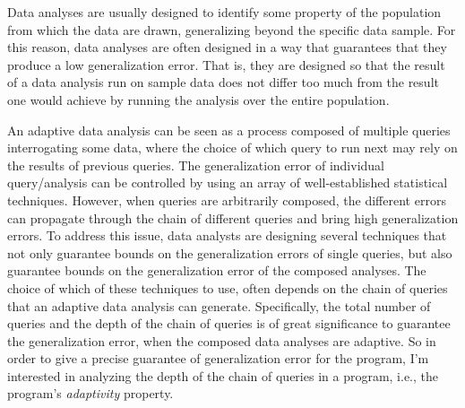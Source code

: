 \begin{abstractpage}

   Data analyses are usually designed to identify some property of the population 
   from which the data are drawn, generalizing beyond the specific data sample. 
  For this reason, data analyses are often designed in a way that guarantees that they produce a low generalization error.
 That is, they are designed so that the result of a data analysis run on sample data does not differ too much from the result one would achieve by running the analysis over the entire population. 
 
 An adaptive data analysis can be seen as a process composed of multiple queries interrogating some data, where the choice of which query to run next may rely on the results of previous queries. 
 The generalization error of individual query/analysis can be controlled by using an array of well-established statistical techniques.
 However, when queries are arbitrarily composed, the different errors can propagate through the chain of different queries and bring high generalization errors. 
 To address this issue, data analysts are designing several techniques that not only guarantee bounds on the generalization errors of single queries, but also guarantee bounds on the generalization error of the composed analyses. 
 The choice of which of these techniques to use, 
 often depends on the chain of queries that an adaptive data analysis can generate.
 Specifically, the total number of queries and the depth of the chain of queries is of great significance 
 to guarantee the generalization error, 
 when the composed data analyses are adaptive. 
 So in order to give a precise guarantee of generalization error
 for the program,
 I'm interested in analyzing the depth of the chain of queries in a program, i.e., the program's \emph{adaptivity} property.


\end{abstractpage}
